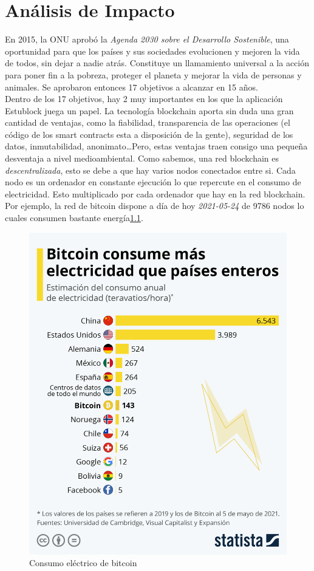 \chapter{Análisis de Impacto}
\label{cap:ImpactoMedioAmbiente}

En 2015, la ONU aprobó la \emph{Agenda 2030 sobre el Desarrollo Sostenible}\cite{agenda2030}, una oportunidad para que los países y sus sociedades evolucionen y mejoren la vida de todos, sin dejar a nadie atrás. Constituye un llamamiento universal a la acción para poner fin a la pobreza, proteger el planeta y mejorar la vida de personas y animales. Se aprobaron entonces 17 objetivos\cite{17objetivos} a alcanzar en 15 años. \\

Dentro de los 17 objetivos, hay 2 muy importantes en los que la aplicación Estublock juega un papel. La tecnología blockchain aporta sin duda una gran cantidad de ventajas, como la fiabilidad, transparencia de las operaciones (el código de los smart contracts esta a disposición de la gente), seguridad de los datos, inmutabilidad, anonimato\dots Pero, estas ventajas traen consigo una pequeña desventaja a nivel medioambiental. Como sabemos, una red blockchain es \emph{descentralizada}, esto se debe a que hay varios nodos conectados entre si. Cada nodo es un ordenador en constante ejecución lo que repercute en el consumo de electricidad. Esto multiplicado por cada ordenador que hay en la red blockchain. Por ejemplo, la red de bitcoin dispone a día de hoy \textit{2021-05-24} de 9786 nodos\cite{bitcoinNodos} lo cuales consumen bastante energía\ref{fig:electricidad_bitcoin}. \\

\begin{figure}[h!]
  \centering
  \includegraphics[width=0.6\linewidth]{figs/ImpactoMedioAmbiente/electricidad_bitcoin}
  \caption[Consumo eléctrico de bitcoin]{Consumo eléctrico de bitcoin}
  \label{fig:electricidad_bitcoin}
\end{figure}

